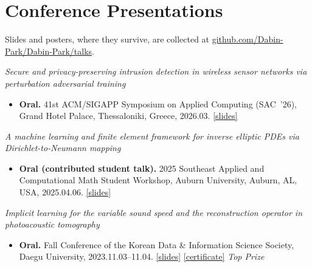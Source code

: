 \documentclass[11pt,a4paper]{article}
\begin{document}
\section{Conference Presentations}

\noindent\small Slides and posters, where they survive, are collected at
\href{https://github.com/Dabin-Park/Dabin-Park/tree/main/talks}{github.com/Dabin-Park/Dabin-Park/talks}.\normalsize

\vspace{0.4em}
\noindent\emph{Secure and privacy-preserving intrusion detection in wireless sensor networks via perturbation adversarial training}
\begin{itemize}
  \item \textbf{Oral.} 41st ACM/SIGAPP Symposium on Applied Computing (SAC~'26),
    Grand Hotel Palace, Thessaloniki, Greece, 2026.03.
    \href{https://github.com/Dabin-Park/Dabin-Park/blob/main/talks/wsn-intrusion-detection/2026-03-sac/slides.pdf}{[slides]}
\end{itemize}

\vspace{0.6em}
\noindent\emph{A machine learning and finite element framework for inverse elliptic PDEs via
Dirichlet-to-Neumann mapping}
\begin{itemize}
  \item \textbf{Oral (contributed student talk).} 2025 Southeast Applied and Computational Math
    Student Workshop, Auburn University, Auburn, AL, USA, 2025.04.06.
    \href{https://github.com/Dabin-Park/Dabin-Park/blob/main/talks/dtn-inverse-elliptic/2025-04-seacm/slides.pdf}{[slides]}
\end{itemize}

\vspace{0.6em}
\noindent\emph{Implicit learning for the variable sound speed and the reconstruction operator in photoacoustic tomography}
\begin{itemize}
  \item \textbf{Oral.} Fall Conference of the Korean Data \& Information Science Society,
    Daegu University, 2023.11.03--11.04.
    \href{https://github.com/Dabin-Park/Dabin-Park/blob/main/talks/photoacoustic-tomography/2023-11-kdiss/slides.pdf}{[slides]}
    \href{https://github.com/Dabin-Park/Dabin-Park/blob/main/talks/photoacoustic-tomography/2023-11-kdiss/certificate.pdf}{[certificate]} \hfill \emph{Top Prize}
\end{itemize}
\end{document}
